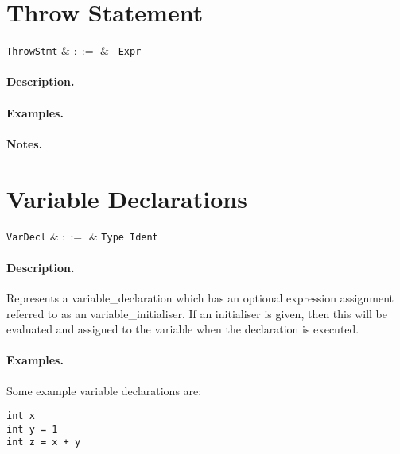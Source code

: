 
\section{Throw Statement}

\begin{syntax}
  \verb+ThrowStmt+ & $::=$ & \ \verb+Expr+\\
\end{syntax}

\paragraph{Description.}

\paragraph{Examples.}

\paragraph{Notes.} 


\section{Variable Declarations}

\begin{syntax}
  \verb+VarDecl+ & $::=$ & \verb+Type+\ \verb+Ident+\ \big[\
  \token{=}\ \verb+Expr+\ \big]\\
\end{syntax}

\paragraph{Description.}  Represents a \gls{variable_declaration}
which has an optional expression assignment referred to as an
\gls{variable_initialiser}.  If an initialiser is given, then this will be evaluated and assigned to the variable when the declaration is executed.

\paragraph{Examples.} Some example variable declarations are:
\begin{lstlisting}
int x
int y = 1
int z = x + y
\end{lstlisting}

